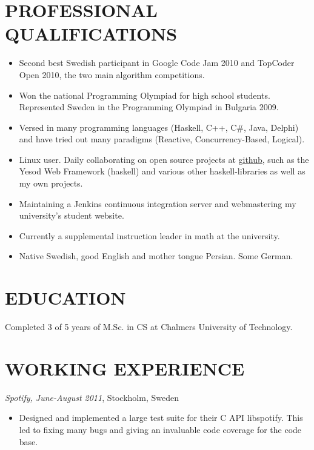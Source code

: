 \documentclass[11pt]{res} %
\begin{document}
\begin{resume}
                                               
\section{PROFESSIONAL QUALIFICATIONS} 
   \begin{itemize} %
   \item Second best Swedish participant in
    Google Code Jam 2010 and TopCoder Open 2010,
    the two main algorithm competitions.
   \item Won the national Programming Olympiad for high school students.
    Represented Sweden in the Programming Olympiad in Bulgaria 2009.
   \item Versed in many programming languages (Haskell, C++, C\#, Java, Delphi)
    and have tried out many paradigms
    (Reactive, Concurrency-Based, Logical).
   \item Linux user. Daily collaborating on open source projects
    at \href{https://github.com/Tarrasch}{github},
    such as the Yesod Web Framework (haskell) and
    various other haskell-libraries as well as my own projects.
   \item Maintaining a Jenkins continuous integration server 
    and webmastering my university's student website.
   \item Currently a supplemental instruction leader in math at the university.
   \item Native Swedish, good English and mother tongue Persian. Some German.
 \end{itemize}
 
\section{EDUCATION} 
 \noindent Completed 3 of 5 years of M.Sc. in CS
  at Chalmers University of Technology.
 
\section{WORKING EXPERIENCE}
\emph{Spotify, June-August 2011}, Stockholm, Sweden
\vspace{0.2in}
   \begin{itemize} %
   \item Designed and implemented a large test 
    suite for their C API libspotify.
    This led to fixing many bugs and giving an 
    invaluable code coverage for the code base.
 \end{itemize}



\end{resume}
\end{document}
